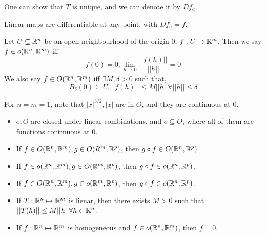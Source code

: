 \documentclass[12pt]{article}
\begin{document}
One can show that $T$ is unique, and we can denote it by $Df_a$.

\begin{rem}
    Linear maps are differentiable at any point, with $Df_a = f$.
\end{rem}
    
\begin{defn}
    Let $U \subseteq \mathbb{R}^n$ be an open neighbourhood of the origin 0, $f:U \rightarrow \mathbb{R}^m$. Then we say $f \in o(\mathbb{R}^n,\mathbb{R}^m)$ iff
    $$f(0) = 0, \lim_{h\rightarrow0} \frac{||f(h)||}{||h||} = 0$$
    We also say $f \in O(\mathbb{R}^n,\mathbb{R}^m)$ iff $\exists M,\delta > 0$ such that,
    $$B_\delta(0) \subseteq U, ||f(h)|| \leq M||h|| \forall ||h|| \leq \delta$$
\end{defn}

\begin{ex}
    For $n=m=1$, note that $|x|^{3/2}, |x|$ are in $O$, and they are continuous at 0.
\end{ex}

\begin{thm}
    \begin{itemize}
        \item $o, O$ are closed under linear combinations, and $o \subseteq O$, where all of them are functions continuous at 0. \\
        \item If $f \in O(\mathbb{R}^n,\mathbb{R}^m), g \in O(R^m,\mathbb{R}^p)$, then $g\circ f \in O(\mathbb{R}^n,\mathbb{R}^p)$. \\
        \item If $f \in o(\mathbb{R}^n,\mathbb{R}^m), g \in O(\mathbb{R}^m,\mathbb{R}^p)$, then $g\circ f \in o(\mathbb{R}^n,\mathbb{R}^p)$. \\
        \item If $f \in O(\mathbb{R}^n,\mathbb{R}^m), g \in o(\mathbb{R}^m,\mathbb{R}^p)$, then $g\circ f \in o(\mathbb{R}^n,\mathbb{R}^p)$. \\
        \item If $T: \mathbb{R}^n\mapsto \mathbb{R}^m$ is lienar, then there exists $M>0$ such that $||T(h)|| \leq M||h|| \forall h \in \mathbb{R}^n$. \\
        \item If $f:\mathbb{R}^n\mapsto\mathbb{R}^m$ is homogeneous and $f \in o(\mathbb{R}^n,\mathbb{R}^m)$, then $f=0$.
    \end{itemize}
\end{thm}
    
    
\end{document}
